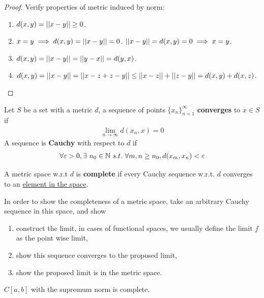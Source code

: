 \documentclass[11pt]{article}
\begin{document}
	\begin{proof}
		Verify properties of metric induced by norm:
		\begin{enumerate}
			\item $d(x, y) = \vert \vert {x - y} \vert \vert \geq 0$.
			\item $x = y \implies d(x, y) = \vert \vert {x - y} \vert \vert = 0$. $\vert \vert {x - y} \vert \vert = d(x, y) = 0 \implies x = y$.
			\item $d(x, y) = \vert \vert {x - y} \vert \vert = \vert \vert {y - x} \vert \vert = d(y, x)$.
			\item $d(x, y) = \vert \vert {x - y} \vert \vert = \vert \vert {x - z + z - y} \vert \vert \leq \vert \vert {x - z} \vert \vert + \vert \vert {z - y} \vert \vert = d(x, y) + d(x, z)$.
		\end{enumerate}
	\end{proof}
	
	\begin{definition}
		Let $S$ be a set with a metric $d$, a sequence of points $\{x_n\}_{n=1}^\infty$ \textbf{converges} to $x \in S$ if
		\begin{align}
			\lim_{n \to \infty} d(x_n, x) = 0
		\end{align}
		A sequence is \textbf{Cauchy} with respect to $d$ if
		\begin{align}
			\forall \varepsilon > 0, \exists\ n_0 \in \N\ s.t.\ \forall m, n \geq n_0, d(x_m, x_n) < \varepsilon
		\end{align}
	\end{definition}
	
	\begin{definition}
		A metric space w.r.t $d$ is \textbf{complete} if every Cauchy sequence w.r.t. $d$ converges to an \ul{element in the space}.
	\end{definition}

	\begin{remark}
		In order to show the completeness of a metric space, take an arbitrary Cauchy sequence in this space, and show
		\begin{enumerate}
			\item construct the limit, in cases of functional spaces, we usually define the limit $f$ as the point wise limit,
			\item show this sequence converges to the proposed limit,
			\item show the proposed limit is in the metric space.
		\end{enumerate}
	\end{remark}
	
	\begin{example}
		$C[a, b]$ with the supremum norm is complete.
	\end{example}
	
\end{document}
